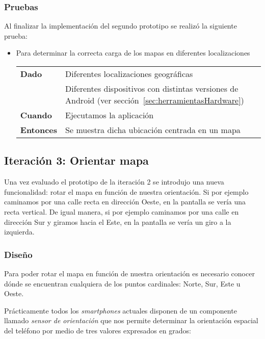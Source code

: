 \subsubsection{Pruebas}

Al finalizar la implementación del segundo prototipo se realizó la siguiente prueba:

\begin{itemize}
  \item Para determinar la correcta carga de los mapas en diferentes localizaciones

  \begin{tabular}{p{}p{}}
    \hline
    \textbf{Dado}     & Diferentes localizaciones geográficas \\
                      & Diferentes dispositivos con distintas versiones de Android (ver
                        sección~\ref{sec:herramientasHardware}) \\
    \textbf{Cuando}   & Ejecutamos la aplicación \\
    \textbf{Entonces} & Se muestra dicha ubicación centrada en un mapa \\
    \hline
  \end{tabular}
\end{itemize}

\subsection{Iteración 3: Orientar mapa}
\label{sec:ite3}

Una vez evaluado el prototipo de la iteración 2 se introdujo una nueva funcionalidad: rotar el mapa
en función de nuestra orientación. Si por ejemplo caminamos por una calle recta en dirección Oeste,
en la pantalla se vería una recta vertical. De igual manera, si por ejemplo caminamos por una calle
en dirección Sur y giramos hacia el Este, en la pantalla se vería un giro a la izquierda.

\subsubsection{Diseño}

Para poder rotar el mapa en función de nuestra orientación es necesario conocer dónde se encuentran
cualquiera de los puntos cardinales: Norte, Sur, Este u Oeste.

Prácticamente todos los \emph{smartphones} actuales disponen de un componente llamado \emph{sensor
  de orientación} que nos permite determinar la orientación espacial del teléfono por medio de tres
valores expresados en grados:

